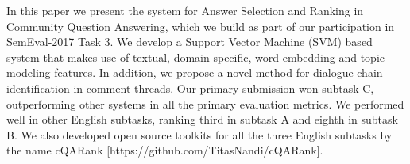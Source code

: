 In this paper we present the system for Answer Selection and Ranking in Community Question Answering, which we build as part of our participation in SemEval-2017 Task 3. We develop a Support Vector Machine (SVM) based system that makes use of textual, domain-specific, word-embedding and topic-modeling features. In addition, we propose a novel method for dialogue chain identification in comment threads. Our primary submission won subtask C, outperforming other systems in all the primary evaluation metrics. We performed well in other English subtasks, ranking third in subtask A and eighth in subtask B. We also developed open source toolkits for all the three English subtasks by the name cQARank [https://github.com/TitasNandi/cQARank].
